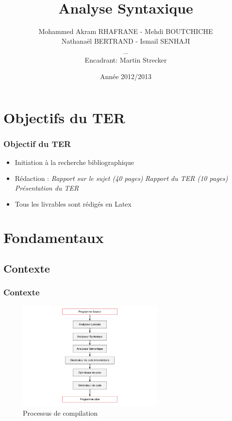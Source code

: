 \documentclass{beamer}
\title[Analyse Syntaxique]{Analyse Syntaxique}
\author{Mohammed Akram RHAFRANE - Mehdi BOUTCHICHE \\Nathanaël BERTRAND - Ismail SENHAJI \\_\\Encadrant: Martin Strecker}
\institute{Université de Toulouse III/IRIT}
\date{Année 2012/2013}
\begin{document}
\begin{frame}
  \titlepage
\end{frame}


\section{Objectifs du TER}\label{sec:Objectifs}

\begin{frame}\frametitle{Objectif du TER}

	\begin{itemize}
	\item Initiation à la recherche bibliographique\newline

	\item Rédaction :\newline
				\subitem \textit{Rapport sur le sujet (40 pages)}\newline
				\subitem \textit{Rapport du TER (10 pages)}\newline
				\subitem \textit{Présentation du TER}\newline			

	\item Tous les livrables sont rédigés en Latex
	\end{itemize}

\end{frame}

\section{Fondamentaux}

\subsection{Contexte}

\begin{frame}\frametitle{Contexte}

	\begin{figure}[h]
		\centering
			\includegraphics[width=0.65\textwidth]{compilation.png}
		\caption{Processus de compilation}
		\label{fig:compilation}
	\end{figure}\FloatBarrier

\end{frame}
\end{document}
